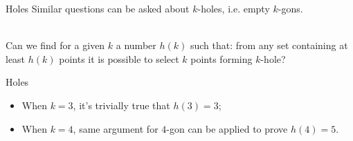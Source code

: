 \documentclass{beamer}
\begin{document}
\begin{frame}{Holes}
	Similar questions can be asked about $k$-holes, i.e. empty $k$-gons. \\~\

	Can we find for a given $k$ a number $h(k)$ such that: from any set containing at least $h(k)$ points it is possible to select $k$ points forming $k$-hole?

\end{frame}

\begin{frame}{Holes}

	\begin{itemize}
		\item
		      When $k=3$, it's trivially true that $h(3) = 3$;
		\item
		      When $k=4$, same argument for $4$-gon can be applied to prove $h(4) = 5$.
	\end{itemize}
\end{frame}
\end{document}
